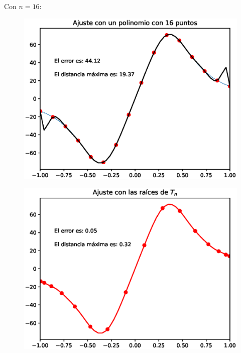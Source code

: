 \documentclass[12pt]{article}
\numberwithin{equation}{section}
\begin{document}
\newpage

Con $n = 16$:
\\
\begin{minipage}{0.45\linewidth}
    \begin{figure}[H]
    \centering
    \includegraphics[scale=0.44]{Imagenes/Interpolacion_Chebychev_16_Polinomio.eps}
    \end{figure}       
\end{minipage}
\hspace{0.1cm}
\begin{minipage}{0.45\linewidth}
\begin{figure}[H]
    \centering
    \includegraphics[scale=0.44]{Imagenes/Interpolacion_Chebychev_16_Raices.eps}
\end{figure}
\end{minipage}
\end{document}
